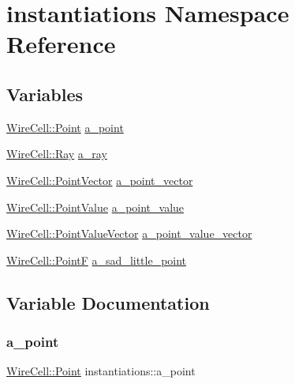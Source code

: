 \hypertarget{namespaceinstantiations}{}\section{instantiations Namespace Reference}
\label{namespaceinstantiations}
\subsection*{Variables}
\begin{DoxyCompactItemize}
\item 
\hyperlink{namespace_wire_cell_ab2b2565fa6432efbb4513c14c988cda9}{Wire\+Cell\+::\+Point} \hyperlink{namespaceinstantiations_a42908d4fad598eceb8d73e9ae38632b9}{a\+\_\+point}
\item 
\hyperlink{namespace_wire_cell_a3ab20d9b438feb7eb1ffaab9ba98af0c}{Wire\+Cell\+::\+Ray} \hyperlink{namespaceinstantiations_a65f11b4e7eaa231ca9192beb9c2b918c}{a\+\_\+ray}
\item 
\hyperlink{namespace_wire_cell_a702d686b1b45c19eed6654d1d5ef8c7b}{Wire\+Cell\+::\+Point\+Vector} \hyperlink{namespaceinstantiations_af631e8b8f75785ba4b2fa3935618a0ea}{a\+\_\+point\+\_\+vector}
\item 
\hyperlink{namespace_wire_cell_abc1e159db6ef5d9b40f5aab6bd93352f}{Wire\+Cell\+::\+Point\+Value} \hyperlink{namespaceinstantiations_aa6d86dbe5d338ebdad397bc5e2378652}{a\+\_\+point\+\_\+value}
\item 
\hyperlink{namespace_wire_cell_a9cdf8eab5ec63490f0328e5ab18219de}{Wire\+Cell\+::\+Point\+Value\+Vector} \hyperlink{namespaceinstantiations_a8265893c3533adc3c9884fa50fecee4d}{a\+\_\+point\+\_\+value\+\_\+vector}
\item 
\hyperlink{namespace_wire_cell_a5ec8176c29cc534839f348e55e50b7f1}{Wire\+Cell\+::\+PointF} \hyperlink{namespaceinstantiations_abf3fff824547455eab0d37c2ef3125ba}{a\+\_\+sad\+\_\+little\+\_\+point}
\end{DoxyCompactItemize}


\subsection{Variable Documentation}
\mbox{\label{namespaceinstantiations_a42908d4fad598eceb8d73e9ae38632b9}} 
\subsubsection{\texorpdfstring{a\+\_\+point}{a\_point}}
{\footnotesize\ttfamily \hyperlink{namespace_wire_cell_ab2b2565fa6432efbb4513c14c988cda9}{Wire\+Cell\+::\+Point} instantiations\+::a\+\_\+point}



